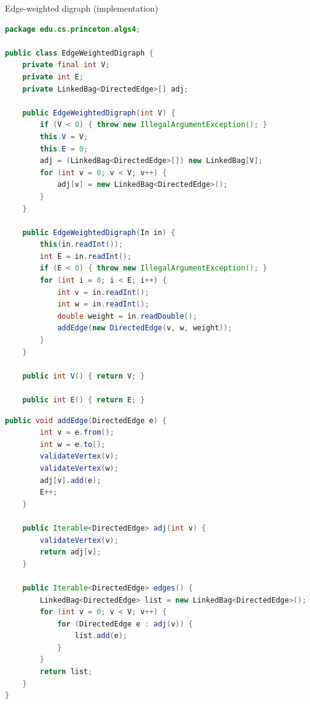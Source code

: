 \documentclass[8pt,a4paper,compress]{beamer}
\begin{document}
\begin{frame}[fragile]
\pause

Edge-weighted digraph (implementation)
\begin{lstlisting}[language=Java]
package edu.cs.princeton.algs4;

public class EdgeWeightedDigraph {
    private final int V;
    private int E;
    private LinkedBag<DirectedEdge>[] adj;
    
    public EdgeWeightedDigraph(int V) {
        if (V < 0) { throw new IllegalArgumentException(); }
        this.V = V;
        this.E = 0;
        adj = (LinkedBag<DirectedEdge>[]) new LinkedBag[V];
        for (int v = 0; v < V; v++) {
            adj[v] = new LinkedBag<DirectedEdge>();
        }
    }

    public EdgeWeightedDigraph(In in) {
        this(in.readInt());
        int E = in.readInt();
        if (E < 0) { throw new IllegalArgumentException(); }
        for (int i = 0; i < E; i++) {
            int v = in.readInt();
            int w = in.readInt();
            double weight = in.readDouble();
            addEdge(new DirectedEdge(v, w, weight));
        }
    }
    
    public int V() { return V; }

    public int E() { return E; }
\end{lstlisting}
\end{frame}

\begin{frame}[fragile]
\pause

\begin{lstlisting}[language=Java]
    public void addEdge(DirectedEdge e) {
        int v = e.from();
        int w = e.to();
        validateVertex(v);
        validateVertex(w);
        adj[v].add(e);
        E++;
    }

    public Iterable<DirectedEdge> adj(int v) {
        validateVertex(v);
        return adj[v];
    }

    public Iterable<DirectedEdge> edges() {
        LinkedBag<DirectedEdge> list = new LinkedBag<DirectedEdge>();
        for (int v = 0; v < V; v++) {
            for (DirectedEdge e : adj(v)) {
                list.add(e);
            }
        }
        return list;
    } 
}
\end{lstlisting}
\end{frame}
\end{document}
